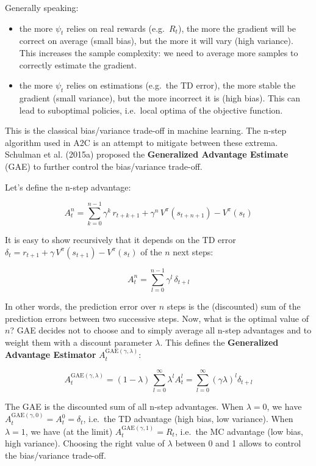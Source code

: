 \documentclass[
  letterpaper,
  DIV=11,
  numbers=noendperiod]{scrreprt}
\providecommand{\tightlist}{%
  \setlength{\itemsep}{0pt}\setlength{\parskip}{0pt}}\usepackage{longtable,booktabs,array}
\begin{document}
Generally speaking:

\begin{itemize}
\tightlist
\item
  the more \(\psi_t\) relies on real rewards (e.g.~\(R_t\)), the more
  the gradient will be correct on average (small bias), but the more it
  will vary (high variance). This increases the sample complexity: we
  need to average more samples to correctly estimate the gradient.
\item
  the more \(\psi_t\) relies on estimations (e.g.~the TD error), the
  more stable the gradient (small variance), but the more incorrect it
  is (high bias). This can lead to suboptimal policies, i.e.~local
  optima of the objective function.
\end{itemize}

This is the classical bias/variance trade-off in machine learning. The
n-step algorithm used in A2C is an attempt to mitigate between these
extrema. Schulman et al. (2015a) proposed the \textbf{Generalized
Advantage Estimate} (GAE) to further control the bias/variance
trade-off.

Let's define the n-step advantage:

\[
    A^{n}_t = \sum_{k=0}^{n-1} \gamma^{k} \, r_{t+k+1} + \gamma^n \, V^\pi(s_{t+n+1}) - V^\pi(s_t)
\]

It is easy to show recursively that it depends on the TD error
\(\delta_t = r_{t+1} + \gamma \, V^\pi(s_{t+1}) - V^\pi(s_t)\) of the
\(n\) next steps:

\[
    A^{n}_t = \sum_{l=0}^{n-1} \gamma^l \, \delta_{t+l}
\]

In other words, the prediction error over \(n\) steps is the
(discounted) sum of the prediction errors between two successive steps.
Now, what is the optimal value of \(n\)? GAE decides not to choose and
to simply average all n-step advantages and to weight them with a
discount parameter \(\lambda\). This defines the \textbf{Generalized
Advantage Estimator} \(A^{\text{GAE}(\gamma, \lambda)}_t\):

\[
    A^{\text{GAE}(\gamma, \lambda)}_t = (1-\lambda) \, \sum_{l=0}^\infty \lambda^l A^l_t = \sum_{l=0}^\infty (\gamma \lambda)^l \delta_{t+l}
\]

The GAE is the discounted sum of all n-step advantages. When
\(\lambda=0\), we have
\(A^{\text{GAE}(\gamma, 0)}_t = A^{0}_t = \delta_t\), i.e.~the TD
advantage (high bias, low variance). When \(\lambda=1\), we have (at the
limit) \(A^{\text{GAE}(\gamma, 1)}_t = R_t\), i.e.~the MC advantage (low
bias, high variance). Choosing the right value of \(\lambda\) between 0
and 1 allows to control the bias/variance trade-off.
\end{document}
